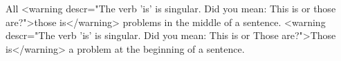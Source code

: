 
    All <warning descr="The verb 'is' is singular. Did you mean: This is or those are?">those is</warning> problems in the middle of a sentence.
    <warning descr="The verb 'is' is singular. Did you mean: This is or Those are?">Those is</warning> a problem at the beginning of a sentence.
